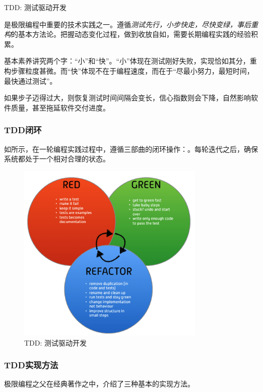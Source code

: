 \begin{content}
\begin{episode}{TDD: 测试驱动开发}
\begin{content}
是极限编程中重要的技术实践之一。遵循\emph{测试先行，小步快走，尽快变绿，事后重构}的基本方法论。把握动态变化过程，做到收放自如，需要长期编程实践的经验积累。

基本素养讲究两个字：“小”和“快”。“小”体现在测试刚好失败，实现恰如其分，重构步骤粒度甚微。而“快”体现不在于编程速度，而在于“尽最小努力，最短时间，最快通过测试”。

如果步子迈得过大，则恢复测试时间间隔会变长，信心指数则会下降，自然影响软件质量，甚至拖延软件交付进度。

\subsubsection{TDD闭环}

如所示，在一轮编程实践过程中，遵循三部曲的闭环操作：。每轮迭代之后，确保系统都处于一个相对合理的状态。

\begin{figure}[H]
\centering
\includegraphics[width=0.8\textwidth]{figures/xunit/tdd-cycle.png}
\caption{TDD: 测试驱动开发}
 \label{fig:tdd-cycle}
\end{figure}

\subsubsection{TDD实现方法}

极限编程之父在经典著作之中，介绍了三种基本的实现方法。


\end{content}
\end{episode}
\end{content}
